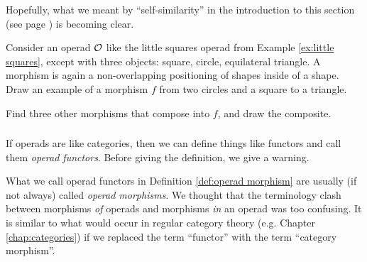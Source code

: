\documentclass[CT4S-EN-RU]{subfiles}
\begin{document}
\begin{example}
Hopefully, what we meant by “self-similarity” in the introduction to this section (see page \pageref{sec:operad}) is becoming clear.

\end{example}

\begin{exercise}\label{exc:little shapes}
Consider an operad $\mathcal{O}$ like the little squares operad from Example \ref{ex:little squares}, except with three objects: square, circle, equilateral triangle. A morphism is again a non-overlapping positioning of shapes inside of a shape. 
\sexc Draw an example of a morphism $f$ from two circles and a square to a triangle.
\item Find three other morphisms that compose into $f$, and draw the composite.
\endsexc
\end{exercise}


\subsubsection{}

If operads are like categories, then we can define things like functors and call them {\em operad functors}. Before giving the definition, we give a warning.

\begin{warning}

What we call operad functors in Definition \ref{def:operad morphism} are usually (if not always) called {\em operad morphisms}. We thought that the terminology clash between morphisms {\em of} operads and morphisms {\em in} an operad was too confusing. It is similar to what would occur in regular category theory (e.g. Chapter \ref{chap:categories}) if we replaced the term “functor” with the term “category morphism”. 

\end{warning}
\end{document}
